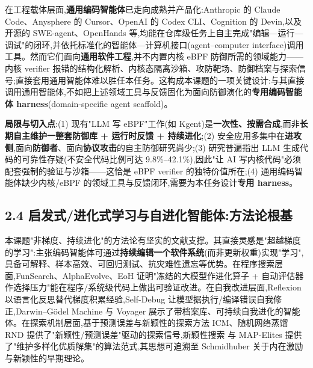 在工程载体层面,\textbf{通用编码智能体}已走向成熟并产品化:Anthropic 的 Claude Code\supercite{anthropic2025claudecode}、Anysphere 的 Cursor\supercite{cursor2024}、OpenAI 的 Codex CLI\supercite{openai2025codexcli}、Cognition 的 Devin\supercite{cognition2024devin},以及开源的 SWE-agent\supercite{yang2024sweagent}、OpenHands\supercite{wang2024openhands} 等,均能在仓库级任务上自主完成"编辑—运行—调试"的闭环,并依托标准化的智能体—计算机接口(agent–computer interface)调用工具。然而它们面向\textbf{通用软件工程},并不内置内核 eBPF 防御所需的领域能力——内核 verifier 报错的结构化解析、内核态隔离沙箱、攻防靶场、防御档案与探索信号;直接套用通用智能体难以胜任本任务。这构成本课题的一项关键设计:与其直接调用通用智能体,不如把上述领域工具与反馈固化为面向防御演化的\textbf{专用编码智能体 harness}(domain-specific agent scaffold)。

\textbf{局限与切入点}:(1) 现有"LLM 写 eBPF"工作(如 Kgent\supercite{yang2024kgent})是\textbf{一次性、按需合成},而非\textbf{长期自主维护一整套防御库 + 运行时反馈 + 持续进化};(2) 安全应用多集中在\textbf{进攻侧},面向\textbf{防御者}、面向\textbf{协议攻击}的自主防御研究尚少;(3) 研究普遍指出 LLM 生成代码的可靠性存疑(不安全代码比例可达 9.8\%–42.1\%\supercite{seccodegen2025}),因此"让 AI 写内核代码"必须配套强制的验证与沙箱——这恰是 eBPF verifier 的独特价值所在;(4) 通用编码智能体\supercite{yang2024sweagent,anthropic2025claudecode}缺少内核/eBPF 的领域工具与反馈闭环,需要为本任务设计\textbf{专用 harness}。

\subsection*{2.4 启发式/进化式学习与自进化智能体:方法论根基}
本课题"非梯度、持续进化"的方法论有坚实的文献支撑。其直接灵感是"超越梯度的学习"\supercite{weng2026hl}:主张编码智能体可通过\textbf{持续编辑一个软件系统}(而非更新权重)实现"学习",具备可解释、样本高效、可回归测试、抗灾难性遗忘等优势。在程序搜索层面,FunSearch\supercite{romeraparedes2024funsearch}、AlphaEvolve\supercite{novikov2025alphaevolve}、EoH\supercite{liu2024eoh} 证明"冻结的大模型作进化算子 + 自动评估器作选择压力"能在程序/系统级代码上做出可验证改进。在自我改进层面,Reflexion\supercite{shinn2023reflexion} 以语言化反思替代梯度积累经验,Self-Debug\supercite{chen2024selfdebug} 让模型据执行/编译错误自我修正,Darwin–Gödel Machine\supercite{zhang2025dgm} 与 Voyager\supercite{wang2023voyager} 展示了带档案库、可持续自我进化的智能体。在探索机制层面,基于预测误差与新颖性的探索方法 ICM\supercite{pathak2017icm}、随机网络蒸馏 RND\supercite{burda2019rnd} 提供了"新颖性/预测误差"驱动的探索信号,新颖性搜索\supercite{lehman2011novelty} 与 MAP-Elites\supercite{mouret2015mapelites} 提供了"维护多样化优质解集"的算法范式,其思想可追溯至 Schmidhuber 关于内在激励与新颖性的早期理论\supercite{schmidhuber2010creativity}。


